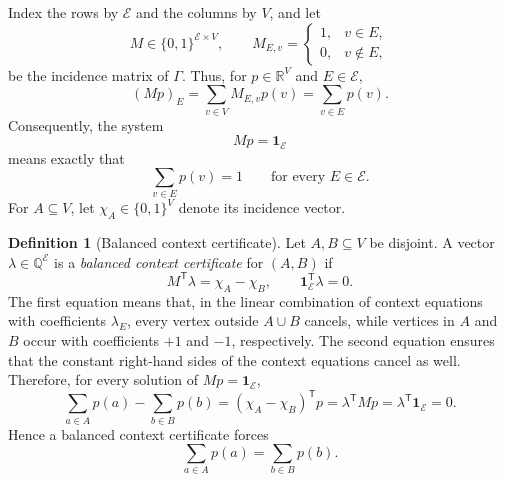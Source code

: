 \documentclass[
  twocolumn,
  aps,
  pra,
  floatfix,
  amsmath,amssymb,
  longbibliography
]{revtex4-2}
\theoremstyle{definition}
\newtheorem{definition}[theorem]{Definition}
\theoremstyle{remark}
\newcommand{\E}{\mathcal E}
\newcommand{\one}{\mathbf 1}
\begin{document}
Index the rows by $\E$ and the columns by $V$, and let
\begin{equation}
 M %
 \in\{0,1\}^{\E\times V},\qquad
 M_{E,v}= %
 \begin{cases}
  1,&v\in E,\\
  0,&v\notin E,
 \end{cases}
 \label{eq:incidence}
\end{equation}
be the incidence matrix of $\Gamma$.  Thus, for
$p\in\mathbb R^V$ and $E\in\E$,
\[
 (Mp)_E
 =\sum_{v\in V}M_{E,v}p(v) %
 =\sum_{v\in E}p(v).
\]
Consequently, the system
\begin{equation}
  Mp=\one_\E
  \label{eq:matrix-normalization}
\end{equation}
means exactly that
\[
 \sum_{v\in E}p(v)=1
 \qquad\text{for every }E\in\E.
\]
For $A\subseteq V$, let $\chi_A\in\{0,1\}^{V}$ denote its incidence vector.
\begin{definition}[Balanced context certificate]
Let $A,B\subseteq V$ be disjoint.  A vector
$\lambda\in\mathbb Q^{\E}$ is a \emph{balanced context certificate} for
$(A,B)$ if
\begin{equation}
 M^{\mathsf T}\lambda=\chi_A-\chi_B,
 \qquad
 \one_\E^{\mathsf T}\lambda=0.
 \label{eq:certificate}
\end{equation}
The first equation means that, in the linear combination of context
equations with coefficients $\lambda_E$, every vertex outside
$A\cup B$ cancels, while vertices in $A$ and $B$ occur with coefficients
$+1$ and $-1$, respectively.  The second equation ensures that the
constant right-hand sides of the context equations cancel as well.
Therefore, for every solution of $Mp=\one_\E$,
\[
 \sum_{a\in A}p(a)-\sum_{b\in B}p(b)
 = (\chi_A-\chi_B)^{\mathsf T}p
 = \lambda^{\mathsf T}Mp
 = \lambda^{\mathsf T}\one_\E
 = 0.
\]
Hence a balanced context certificate forces
\[
 \sum_{a\in A}p(a)=\sum_{b\in B}p(b).
\]
\end{definition}
\end{document}
